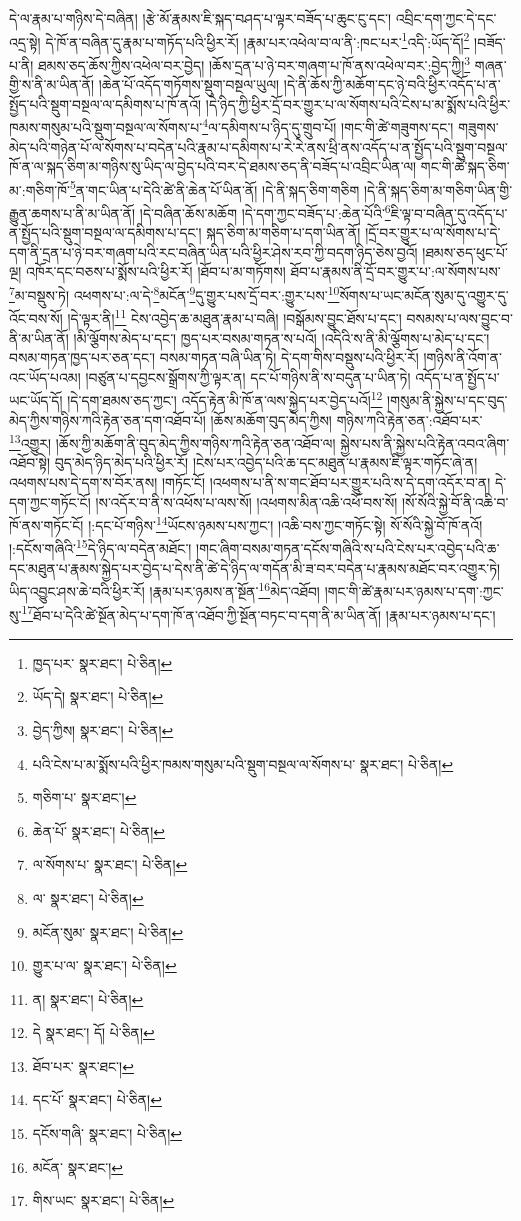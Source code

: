 དེ་ལ་རྣམ་པ་གཉིས་དེ་བཞིན། །རྩེ་མོ་རྣམས་ཇི་སྐད་བཤད་པ་ལྟར་བཟོད་པ་ཆུང་ངུ་དང་། འབྲིང་དག་ཀྱང་དེ་དང་འདྲ་སྟེ། དེ་ཁོ་ན་བཞིན་དུ་རྣམ་པ་གཏོད་པའི་ཕྱིར་རོ། །རྣམ་པར་འཕེལ་བ་ལ་ནི་:ཁང་པར་\footnote{ཁྱད་པར་  སྣར་ཐང་།  པེ་ཅིན། }འདི་:ཡོད་དོ།\footnote{ཡོད་དེ།  སྣར་ཐང་།  པེ་ཅིན། } །བཟོད་པ་ནི། ཐམས་ཅད་ཆོས་ཀྱིས་འཕེལ་བར་བྱེད། །ཆོས་དྲན་པ་ཉེ་བར་གཞག་པ་ཁོ་ནས་འཕེལ་བར་:བྱེད་ཀྱི།\footnote{བྱེད་ཀྱིས།  སྣར་ཐང་།  པེ་ཅིན། } གཞན་གྱི་ས་ནི་མ་ཡིན་ནོ། །ཆེན་པོ་འདོད་གཏོགས་སྡུག་བསྔལ་ཡུལ། །དེ་ནི་ཆོས་ཀྱི་མཆོག་དང་ཉེ་བའི་ཕྱིར་འདོད་པ་ན་སྤྱོད་པའི་སྡུག་བསྔལ་ལ་དམིགས་པ་ཁོ་ནའོ། །དེ་ཉིད་ཀྱི་ཕྱིར་དྲོ་བར་གྱུར་པ་ལ་སོགས་པའི་ངེས་པ་མ་སྨོས་པའི་ཕྱིར་ཁམས་གསུམ་པའི་སྡུག་བསྔལ་ལ་སོགས་པ་\footnote{པའི་ངེས་པ་མ་སྨོས་པའི་ཕྱིར་ཁམས་གསུམ་པའི་སྡུག་བསྔལ་ལ་སོགས་པ་  སྣར་ཐང་།  པེ་ཅིན། }ལ་དམིགས་པ་ཉིད་དུ་གྲུབ་པོ། །གང་གི་ཚེ་གཟུགས་དང་། གཟུགས་མེད་པའི་གཉེན་པོ་ལ་སོགས་པ་བདེན་པའི་རྣམ་པ་དམིགས་པ་རེ་རེ་ནས་ཕྲི་ནས་འདོད་པ་ན་སྤྱོད་པའི་སྡུག་བསྔལ་ཁོ་ན་ལ་སྐད་ཅིག་མ་གཉིས་སུ་ཡིད་ལ་བྱེད་པའི་བར་དེ་ཐམས་ཅད་ནི་བཟོད་པ་འབྲིང་ཡིན་ལ། གང་གི་ཚེ་སྐད་ཅིག་མ་:གཅིག་ཁོ་\footnote{གཅིག་པ་  སྣར་ཐང་། }ན་གང་ཡིན་པ་དེའི་ཚེ་ནི་ཆེན་པོ་ཡིན་ནོ། །དེ་ནི་སྐད་ཅིག་གཅིག །དེ་ནི་སྐད་ཅིག་མ་གཅིག་ཡིན་གྱི་རྒྱུན་ཆགས་པ་ནི་མ་ཡིན་ནོ། །དེ་བཞིན་ཆོས་མཆོག །དེ་དག་ཀྱང་བཟོད་པ་:ཆེན་པོའི་\footnote{ཆེན་པོ་  སྣར་ཐང་།  པེ་ཅིན། }ཇི་ལྟ་བ་བཞིན་དུ་འདོད་པ་ན་སྤྱོད་པའི་སྡུག་བསྔལ་ལ་དམིགས་པ་དང་། སྐད་ཅིག་མ་གཅིག་པ་དག་ཡིན་ནོ། །དྲོ་བར་གྱུར་པ་ལ་སོགས་པ་དེ་དག་ནི་དྲན་པ་ཉེ་བར་གཞག་པའི་རང་བཞིན་ཡིན་པའི་ཕྱིར་ཤེས་རབ་ཀྱི་བདག་ཉིད་ཅེས་བྱའོ། །ཐམས་ཅད་ཕུང་པོ་ལྔ། འཁོར་དང་བཅས་པ་སྨོས་པའི་ཕྱིར་རོ། །ཐོབ་པ་མ་གཏོགས། ཐོབ་པ་རྣམས་ནི་དྲོ་བར་གྱུར་པ་:ལ་སོགས་པས་\footnote{ལ་སོགས་པ་  སྣར་ཐང་།  པེ་ཅིན། }མ་བསྡུས་ཏེ། འཕགས་པ་:ལ་དེ་\footnote{ལ་  སྣར་ཐང་།  པེ་ཅིན། }མངོན་\footnote{མངོན་སུམ་  སྣར་ཐང་།  པེ་ཅིན། }དུ་གྱུར་པས་དྲོ་བར་:གྱུར་པས་\footnote{གྱུར་པ་ལ་  སྣར་ཐང་།  པེ་ཅིན། }སོགས་པ་ཡང་མངོན་སུམ་དུ་འགྱུར་དུ་འོང་བས་སོ། །དེ་ལྟར་ནི།\footnote{ན།  སྣར་ཐང་།  པེ་ཅིན། } ངེས་འབྱེད་ཆ་མཐུན་རྣམ་པ་བཞི། །བསྒོམས་བྱུང་ཐོས་པ་དང་། བསམས་པ་ལས་བྱུང་བ་ནི་མ་ཡིན་ནོ། །མི་ལྕོགས་མེད་པ་དང་། ཁྱད་པར་བསམ་གཏན་ས་པའོ། །འདིའི་ས་ནི་མི་ལྕོགས་པ་མེད་པ་དང་། བསམ་གཏན་ཁྱད་པར་ཅན་དང་། བསམ་གཏན་བཞི་ཡིན་ཏེ། དེ་དག་གིས་བསྡུས་པའི་ཕྱིར་རོ། །གཉིས་ནི་འོག་ན་འང་ཡོད་པའམ། །བཙུན་པ་དབྱངས་སྒྲོགས་ཀྱི་ལྟར་ན། དང་པོ་གཉིས་ནི་ས་བདུན་པ་ཡིན་ཏེ། འདོད་པ་ན་སྤྱོད་པ་ཡང་ཡོད་དོ། །དེ་དག་ཐམས་ཅད་ཀྱང་། འདོད་རྟེན་མི་ཁོ་ན་ལས་སྐྱེད་པར་བྱེད་པའོ།\footnote{དེ  སྣར་ཐང་། དོ།  པེ་ཅིན། } །གསུམ་ནི་སྐྱེས་པ་དང་བུད་མེད་ཀྱིས་གཉིས་ཀའི་རྟེན་ཅན་དག་འཐོབ་པོ། །ཆོས་མཆོག་བུད་མེད་ཀྱིས། གཉིས་ཀའི་རྟེན་ཅན་:འཐོབ་པར་\footnote{ཐོབ་པར་  སྣར་ཐང་། }འགྱུར། །ཆོས་ཀྱི་མཆོག་ནི་བུད་མེད་ཀྱིས་གཉིས་ཀའི་རྟེན་ཅན་འཐོབ་ལ། སྐྱེས་པས་ནི་སྐྱེས་པའི་རྟེན་འབའ་ཞིག་འཐོབ་སྟེ། བུད་མེད་ཉིད་མེད་པའི་ཕྱིར་རོ། །ངེས་པར་འབྱེད་པའི་ཆ་དང་མཐུན་པ་རྣམས་ཇི་ལྟར་གཏོང་ཞེ་ན། འཕགས་པས་དེ་དག་ས་བོར་ནས། །གཏོང་ངོ། །འཕགས་པ་ནི་ས་གང་ཐོབ་པར་གྱུར་པའི་ས་དེ་དག་འདོར་བ་ན། དེ་དག་ཀྱང་གཏོང་ངོ། །ས་འདོར་བ་ནི་ས་འཕོས་པ་ལས་སོ། །འཕགས་མིན་འཆི་འཕོ་བས་སོ། །སོ་སོའི་སྐྱེ་བོ་ནི་འཆི་བ་ཁོ་ནས་གཏོང་ངོ། །:དང་པོ་གཉིས་\footnote{དང་པོ་  སྣར་ཐང་།  པེ་ཅིན། }ཡོངས་ཉམས་པས་ཀྱང་། །འཆི་བས་ཀྱང་གཏོང་སྟེ། སོ་སོའི་སྐྱེ་བོ་ཁོ་ནའོ། །:དངོས་གཞིའི་\footnote{དངོས་གཞི་  སྣར་ཐང་།  པེ་ཅིན། }དེ་ཉིད་ལ་བདེན་མཐོང་། །གང་ཞིག་བསམ་གཏན་དངོས་གཞིའི་ས་པའི་ངེས་པར་འབྱེད་པའི་ཆ་དང་མཐུན་པ་རྣམས་སྐྱེད་པར་བྱེད་པ་དེས་ནི་ཚེ་དེ་ཉིད་ལ་གདོན་མི་ཟ་བར་བདེན་པ་རྣམས་མཐོང་བར་འགྱུར་ཏེ། ཡིད་འབྱུང་ཤས་ཆེ་བའི་ཕྱིར་རོ། །རྣམ་པར་ཉམས་ན་སྔོན་\footnote{མངོན་  སྣར་ཐང་། }མེད་འཐོབ། །གང་གི་ཚེ་རྣམ་པར་ཉམས་པ་དག་:ཀྱང་སུ་\footnote{གིས་ཡང་  སྣར་ཐང་།  པེ་ཅིན། }ཐོབ་པ་དེའི་ཚེ་སྔོན་མེད་པ་དག་ཁོ་ན་འཐོབ་ཀྱི་སྔོན་བཏང་བ་དག་ནི་མ་ཡིན་ནོ། །རྣམ་པར་ཉམས་པ་དང་། 